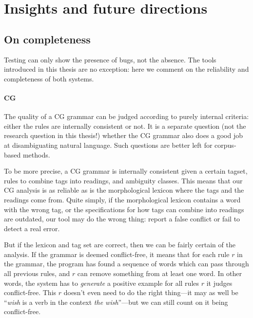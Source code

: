 

\section{Insights and future directions}

\subsection{On completeness}

Testing can only show the presence of bugs, not the absence. The tools
introduced in this thesis are no exception: here we comment on the
reliability and completeness of both systems.


\paragraph{CG}

The quality of a CG grammar can be judged according to purely internal
criteria: either the rules are internally consistent or not. It is a
separate question (not the research question in this thesis!) whether
the CG grammar also does a good job at disambiguating natural
language. Such questions are better left for corpus-based methods.

To be more precise, a CG grammar is internally consistent given a
certain tagset, rules to combine tags into readings, and ambiguity
classes. %
This means that our CG analysis is as reliable as is the morphological
lexicon where the tags and the readings come from. Quite simply, if
the morphological lexicon contains a word with the wrong tag, or the
specifications for how tags can combine into readings are outdated,
our tool may do the wrong thing: report a false conflict or fail to
detect a real error.

But if the lexicon and tag set are correct, then we can be fairly
certain of the analysis. If the grammar is deemed conflict-free, it
means that for each rule $r$ in the grammar, the program has found a
sequence of words which can pass through all previous rules, and $r$
can remove something from at least one word. In other words, the
system has to \emph{generate} a positive example for all rules $r$ it
judges conflict-free. %
This $r$ doesn't even need to do the right thing---it may as well be
``\emph{wish} is a verb in the context \emph{the wish}''---but we can
still count on it being conflict-free.


